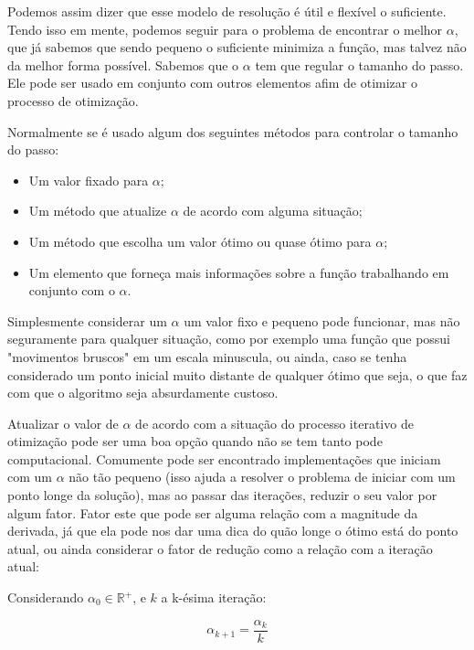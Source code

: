 Podemos assim dizer que esse modelo de resolução é útil e flexível o suficiente.
Tendo isso em mente, podemos seguir para o problema de encontrar o melhor
\(\alpha\), que já sabemos que sendo pequeno o suficiente minimiza a função, mas
talvez não da melhor forma possível. Sabemos que o \(\alpha\) tem que regular o
tamanho do passo. Ele pode ser usado em conjunto com outros elementos afim de
otimizar o processo de otimização.

Normalmente se é usado algum dos seguintes métodos para controlar o tamanho do
passo:

    \begin{itemize}
            \item Um valor fixado para \(\alpha\);
            \item Um método que atualize \(\alpha\) de acordo com alguma situação;
            \item Um método que escolha um valor ótimo ou quase ótimo para \(\alpha\);
            \item Um elemento que forneça mais informações sobre a função trabalhando em conjunto com o \(\alpha\).
    \end{itemize}


Simplesmente considerar um \(\alpha\) um valor fixo e pequeno pode funcionar,
mas não seguramente para qualquer situação, como por exemplo uma função que
possui "movimentos bruscos" em um escala minuscula, ou ainda, caso se tenha
considerado um ponto inicial muito distante de qualquer ótimo que seja, o que
faz com que o algoritmo seja absurdamente custoso.

Atualizar o valor de \(\alpha\) de acordo com a situação do processo iterativo
de otimização pode ser uma boa opção quando não se tem tanto pode computacional.
Comumente pode ser encontrado implementações que iniciam com um \(\alpha\) não
tão pequeno (isso ajuda a resolver o problema de iniciar com um ponto longe da 
solução), mas ao passar das iterações, reduzir o seu valor por algum fator.
Fator este que pode ser alguma relação com a magnitude da derivada, já que ela
pode nos dar uma dica do quão longe o ótimo está do ponto atual, ou ainda
considerar o fator de redução como a relação com a iteração atual:


Considerando \(\alpha_{0} \in \mathbb{R}^{+}  \), e \(k\) a k-ésima iteração:

\begin{equation}
    \alpha_{k+1} = \frac{\alpha_{k}}{k}
\end{equation}

